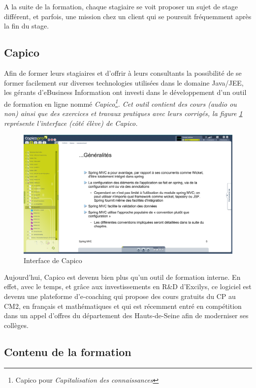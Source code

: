 A la suite de la formation, chaque stagiaire se voit proposer un sujet de stage différent, et parfois, une mission chez un client qui se poursuit fréquemment après la fin du stage. 

\subsection{Capico}

Afin de former leurs stagiaires et d'offrir à leurs consultants la possibilité de se former facilement sur diverses technologies utilisées dans le domaine Java/JEE, les gérants d'eBusiness Information ont investi dans le développement d'un outil de formation en ligne nommé \em{Capico}\footnote{Capico pour \em{Capi}talisation des \em{co}nnaissances}. Cet outil contient des cours (audio ou non) ainsi que des exercices et travaux pratiques avec leurs corrigés, la figure \ref{capico} représente l'interface (côté élève) de Capico.

\begin{figure}[ht]
\begin{center}
\includegraphics[width=400pt]{img/capico.png}
\end{center}
\caption{Interface de Capico}
\label{capico}
\end{figure}

Aujourd'hui, Capico est devenu bien plus qu'un outil de formation interne. En effet, avec le temps, et grâce aux investissements en R\&D d'Excilys, ce logiciel est devenu une plateforme d'e-coaching qui propose des cours gratuits du CP au CM2, en français et mathématiques\cite{capicofr} et qui est récemment entré en compétition dans un appel d'offres du département des Hauts-de-Seine afin de moderniser ses collèges.  

\subsection{Contenu de la formation}

